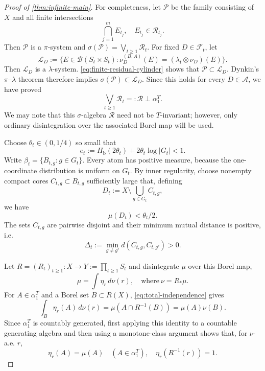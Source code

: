 \documentclass[10pt,a4paper]{amsart}
\newcommand{\cR}{\mathcal R}
\newcommand{\join}{\bigvee}
\newcommand{\Hb}{H_{\mathrm b}}
\numberwithin{equation}{section}
\begin{document}
\begin{proof}[Proof of \cref{thm:infinite-main}]
		For completeness, let $\mathscr P$ be the family consisting of $X$ and all
		finite intersections
		\[
		\bigcap_{j=1}^m E_{t_j},
		\quad E_{t_j}\in\mathcal R_{t_j}.
		\]
		Then $\mathscr P$ is a $\pi$-system and
		$\sigma(\mathscr P)=\bigvee_{t\geq1}\mathcal R_t$. For fixed \(D\in\mathcal F_t\), let
		\[
		\mathscr L_D
		:=
		\{E\in\mathcal B(S_t\times S_t):
		\nu_D^{(B,A)}(E)=(\lambda_t\otimes\nu_D)(E)\}.
		\]
		Then \(\mathscr L_D\) is a \(\lambda\)-system.
		\eqref{eq:finite-residual-cylinder} shows that
		$\mathscr P\subset\mathscr L_D$.  Dynkin's $\pi$--$\lambda$ theorem therefore
		implies $\sigma(\mathscr P)\subset\mathscr L_D$.  Since this holds for every
		$D\in\mathcal A$, we have proved
		\begin{equation}
			\join_{t\geq1}\cR_t =:\cR
			\perp
			\alpha_1^T.
			\label{eq:total-independence}
		\end{equation}
		We may note that this $\sigma$-algebra $\cR$ need not be $T$-invariant; however, only ordinary
		disintegration over the associated Borel map will be used.
		
		
		Choose
		$\theta_t\in(0,1/4)$ so small that
		\begin{equation}
			e_t:=\Hb(2\theta_t)+2\theta_t\log|G_t|<1.
			\label{eq:hamming-error}
		\end{equation}
		Write $\beta_t=\{B_{t,g}:g\in G_t\}$.  Every atom has positive measure,
		because the one-coordinate distribution is uniform on
		$G_t$.  By inner regularity, choose nonempty compact cores
		$C_{t,g}\subset B_{t,g}$ sufficiently large that, defining
		\[
		D_t:=X\setminus\bigcup_{g\in G_t}C_{t,g},
		\]
		we have
		\begin{equation}
			\mu(D_t)<\theta_t/2.
			\label{eq:bad-set-small}
		\end{equation}
		The sets $C_{t,g}$ are pairwise disjoint and their minimum mutual distance is positive, i.e.
		\begin{equation}
			\Delta_t
			:=
			\min_{g\neq g'}d(C_{t,g},C_{t,g'})>0.
			\label{eq:compact-core-gap}
		\end{equation}
		
		Let $R=(R_t)_{t\geq1}: X \to Y:= \prod_{t\geq 1} S_t$ and disintegrate $\mu$ over this Borel map,
		\[
		\mu=\int\eta_r\,d\nu(r), \quad \text{where}~\nu=R_* \mu.
		\]
		For $A\in\alpha_1^T$ and a Borel set $B \subset R(X)$,
		\eqref{eq:total-independence} gives
		\[
		\int_B\eta_r(A)\,d\nu(r)
		=
		\mu(A\cap R^{-1}(B))
		=
		\mu(A)\nu(B).
		\]
		Since $\alpha_1^T$ is countably generated, first applying this identity to a
		countable generating algebra and then using a monotone-class argument shows
		that, for $\nu$-a.e.  $r$,
		\begin{equation}
			\eta_r(A)=\mu(A)
			\quad(A\in\alpha_1^T),
			\quad
			\eta_r(R^{-1}(r))=1.
			\label{eq:fiber-properties}
		\end{equation}
		

\end{proof}
\end{document}
